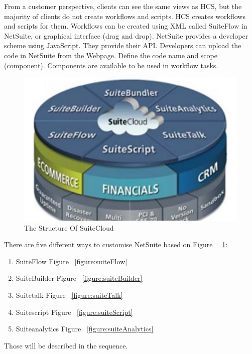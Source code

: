 From a customer perspective, clients can see the same views as HCS, but the majority of clients do not create workflows and scripts. HCS creates workflows and scripts for them.
Workflows can be created using XML called SuiteFlow in NetSuite, or graphical interface (drag and drop). NetSuite provides a developer scheme using JavaScript. They provide their API. Developers can upload the code in NetSuite from the Webpage. Define the code name and scope (component). Components are available to be used in workflow tasks.\par


\begin{figure}[!htb]
    \centering 
    \includegraphics[scale=0.7]{resource/StructureOfSuiteCloud.jpg}
    \caption{The Structure Of SuiteCloud}
    \label{figure:structureSuiteCloud}
\end{figure}




There are five different ways to customise NetSuite based on Figure ~~\ref{figure:structureSuiteCloud}:
\begin{enumerate}
\item SuiteFlow  Figure ~\ref{figure:suiteFlow}
\item SuiteBuilder  Figure ~\ref{figure:suiteBuilder}
\item Suitetalk Figure ~\ref{figure:suiteTalk}
\item Suitescript Figure ~\ref{figure:suiteScript}
\item Suiteanalytics Figure ~\ref{figure:suiteAnalytics}
\end{enumerate}

Those will be described in the sequence. 

